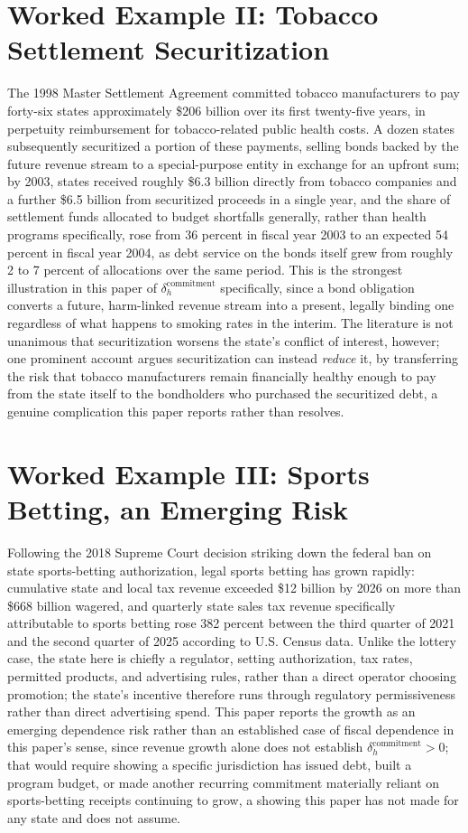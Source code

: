 \documentclass[11pt]{article}
\begin{document}
\section{Worked Example II: Tobacco Settlement Securitization}

The 1998 Master Settlement Agreement committed tobacco manufacturers to pay forty-six states approximately \$206 billion over its first twenty-five years, in perpetuity reimbursement for tobacco-related public health costs. A dozen states subsequently securitized a portion of these payments, selling bonds backed by the future revenue stream to a special-purpose entity in exchange for an upfront sum; by 2003, states received roughly \$6.3 billion directly from tobacco companies and a further \$6.5 billion from securitized proceeds in a single year, and the share of settlement funds allocated to budget shortfalls generally, rather than health programs specifically, rose from 36 percent in fiscal year 2003 to an expected 54 percent in fiscal year 2004, as debt service on the bonds itself grew from roughly 2 to 7 percent of allocations over the same period. This is the strongest illustration in this paper of $\delta_h^{\text{commitment}}$ specifically, since a bond obligation converts a future, harm-linked revenue stream into a present, legally binding one regardless of what happens to smoking rates in the interim. The literature is not unanimous that securitization worsens the state's conflict of interest, however; one prominent account argues securitization can instead \emph{reduce} it, by transferring the risk that tobacco manufacturers remain financially healthy enough to pay from the state itself to the bondholders who purchased the securitized debt, a genuine complication this paper reports rather than resolves.

\section{Worked Example III: Sports Betting, an Emerging Risk}

Following the 2018 Supreme Court decision striking down the federal ban on state sports-betting authorization, legal sports betting has grown rapidly: cumulative state and local tax revenue exceeded \$12 billion by 2026 on more than \$668 billion wagered, and quarterly state sales tax revenue specifically attributable to sports betting rose 382 percent between the third quarter of 2021 and the second quarter of 2025 according to U.S. Census data. Unlike the lottery case, the state here is chiefly a regulator, setting authorization, tax rates, permitted products, and advertising rules, rather than a direct operator choosing promotion; the state's incentive therefore runs through regulatory permissiveness rather than direct advertising spend. This paper reports the growth as an emerging dependence risk rather than an established case of fiscal dependence in this paper's sense, since revenue growth alone does not establish $\delta_h^{\text{commitment}} > 0$; that would require showing a specific jurisdiction has issued debt, built a program budget, or made another recurring commitment materially reliant on sports-betting receipts continuing to grow, a showing this paper has not made for any state and does not assume.
\end{document}
